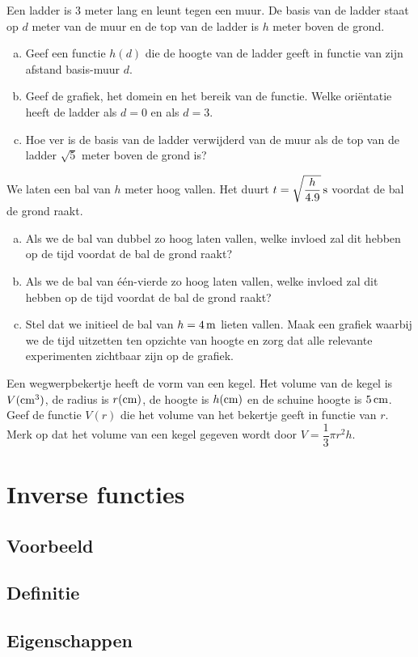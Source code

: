 \documentclass[12pt,twoside]{article}
\begin{document}
\begin{oefening} %
Een ladder is 3 meter lang en leunt tegen een muur. De basis van de ladder staat op $d$ meter van de muur en de top van de ladder is $h$ meter boven de grond.
\begin{enumerate}[(a)]
  \item Geef een functie $h(d)$ die de hoogte van de ladder geeft in functie van zijn afstand basis-muur $d$.
  \item Geef de grafiek, het domein en het bereik van de functie. Welke oriëntatie heeft de ladder als $d=0$ en als $d=3$.
  \item Hoe ver is de basis van de ladder verwijderd van de muur als de top van de ladder $\sqrt{5}$ meter boven de grond is?
\end{enumerate}
\end{oefening}

\begin{oefening} %
We laten een bal van $h$ meter hoog vallen. Het duurt $t=\sqrt{\dfrac{h}{4.9}}\s$ voordat de bal de grond raakt.
\begin{enumerate}[(a)]
  \item Als we de bal van dubbel zo hoog laten vallen, welke invloed zal dit hebben op de tijd voordat de bal de grond raakt?
  \item Als we de bal van één-vierde zo hoog laten vallen, welke invloed zal dit hebben op de tijd voordat de bal de grond raakt?
  \item Stel dat we initieel de bal van $h=4\m$ lieten vallen. Maak een grafiek waarbij we de tijd uitzetten ten opzichte van hoogte en zorg dat alle relevante experimenten zichtbaar zijn op de grafiek.
\end{enumerate}
\end{oefening}

\begin{oefening} %
Een wegwerpbekertje heeft de vorm van een kegel. Het volume van de kegel is $V (\cm^3)$, de radius is $r (\cm)$, de hoogte is $h (\cm)$ en de schuine hoogte is $5 \cm$. Geef de functie $V(r)$ die het volume van het bekertje geeft in functie van $r$. Merk op dat het volume van een kegel gegeven wordt door $V=\dfrac{1}{3}\pi r^2 h$.
\end{oefening}

\pagebreak
\section{Inverse functies}

\subsection{Voorbeeld}

\subsection{Definitie}

\subsection{Eigenschappen}
\end{document}
